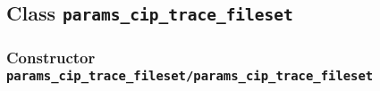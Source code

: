 \subsection{Class \texttt{params\_cip\_trace\_fileset}}%
%
\label{ref_params_cip_trace_fileset}%
\hypertarget{ref_params_cip_trace_fileset}{}%
\subsubsection[Constructor \texttt{params\_cip\_trace\_fileset}]{Constructor \texttt{params\_cip\_trace\_fileset/params\_cip\_trace\_fileset}}%
%
\label{ref_params_cip_trace_fileset__params_cip_trace_fileset}%
\hypertarget{ref_params_cip_trace_fileset__params_cip_trace_fileset}{}%
